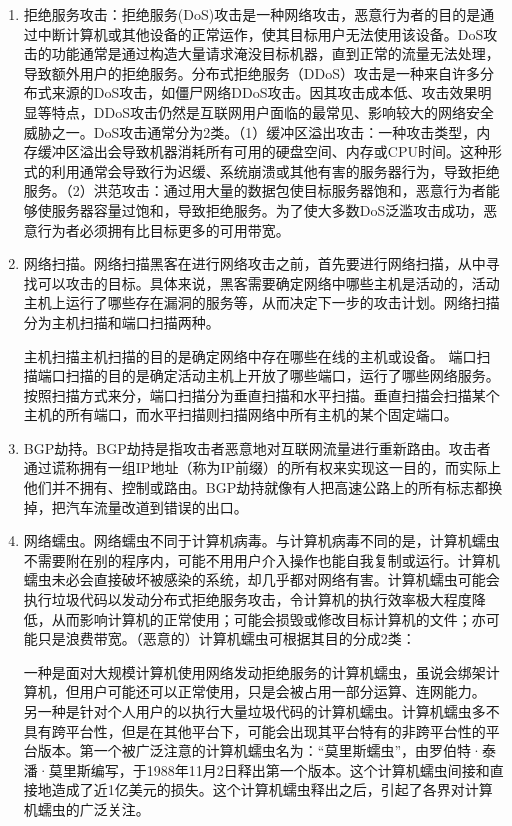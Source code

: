 \begin{enumerate}
    \item 拒绝服务攻击：拒绝服务(DoS)攻击是一种网络攻击，恶意行为者的目的是通过中断计算机或其他设备的正常运作，使其目标用户无法使用该设备。DoS攻击的功能通常是通过构造大量请求淹没目标机器，直到正常的流量无法处理，导致额外用户的拒绝服务。分布式拒绝服务（DDoS）攻击是一种来自许多分布式来源的DoS攻击，如僵尸网络DDoS攻击。因其攻击成本低、攻击效果明显等特点，DDoS攻击仍然是互联网用户面临的最常见、影响较大的网络安全威胁之一。DoS攻击通常分为2类。（1）缓冲区溢出攻击：一种攻击类型，内存缓冲区溢出会导致机器消耗所有可用的硬盘空间、内存或CPU时间。这种形式的利用通常会导致行为迟缓、系统崩溃或其他有害的服务器行为，导致拒绝服务。（2）洪范攻击：通过用大量的数据包使目标服务器饱和，恶意行为者能够使服务器容量过饱和，导致拒绝服务。为了使大多数DoS泛滥攻击成功，恶意行为者必须拥有比目标更多的可用带宽。

    \item 网络扫描。网络扫描黑客在进行网络攻击之前，首先要进行网络扫描，从中寻找可以攻击的目标。具体来说，黑客需要确定网络中哪些主机是活动的，活动主机上运行了哪些存在漏洞的服务等，从而决定下一步的攻击计划。网络扫描分为主机扫描和端口扫描两种。

    主机扫描主机扫描的目的是确定网络中存在哪些在线的主机或设备。
    端口扫描端口扫描的目的是确定活动主机上开放了哪些端口，运行了哪些网络服务。按照扫描方式来分，端口扫描分为垂直扫描和水平扫描。垂直扫描会扫描某个主机的所有端口，而水平扫描则扫描网络中所有主机的某个固定端口。

    \item BGP劫持。BGP劫持是指攻击者恶意地对互联网流量进行重新路由。攻击者通过谎称拥有一组IP地址（称为IP前缀）的所有权来实现这一目的，而实际上他们并不拥有、控制或路由。BGP劫持就像有人把高速公路上的所有标志都换掉，把汽车流量改道到错误的出口。
    
    \item 网络蠕虫。网络蠕虫不同于计算机病毒。与计算机病毒不同的是，计算机蠕虫不需要附在别的程序内，可能不用用户介入操作也能自我复制或运行。计算机蠕虫未必会直接破坏被感染的系统，却几乎都对网络有害。计算机蠕虫可能会执行垃圾代码以发动分布式拒绝服务攻击，令计算机的执行效率极大程度降低，从而影响计算机的正常使用；可能会损毁或修改目标计算机的文件；亦可能只是浪费带宽。（恶意的）计算机蠕虫可根据其目的分成2类：

    一种是面对大规模计算机使用网络发动拒绝服务的计算机蠕虫，虽说会绑架计算机，但用户可能还可以正常使用，只是会被占用一部分运算、连网能力。
    另一种是针对个人用户的以执行大量垃圾代码的计算机蠕虫。计算机蠕虫多不具有跨平台性，但是在其他平台下，可能会出现其平台特有的非跨平台性的平台版本。第一个被广泛注意的计算机蠕虫名为：“莫里斯蠕虫”，由罗伯特·泰潘·莫里斯编写，于1988年11月2日释出第一个版本。这个计算机蠕虫间接和直接地造成了近1亿美元的损失。这个计算机蠕虫释出之后，引起了各界对计算机蠕虫的广泛关注。


\end{enumerate}
